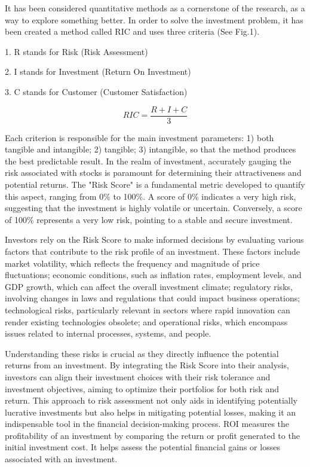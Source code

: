 \begin{multicols}{2}
It has been considered quantitative methods as a cornerstone of the
research, as a way to explore something better. In order to solve the
investment problem, it has been created a method called RIC and uses
three criteria (See Fig.1).

1. R stands for Risk (Risk Assessment)

2. I stands for Investment (Return On Investment)

3. C stands for Customer (Customer Satisfaction)

\begin{equation}
RIC = \frac{R + I + C}{3}
\end{equation}

Each criterion is responsible for the main investment parameters: 1)
both tangible and intangible; 2) tangible; 3) intangible, so that the
method produces the best predictable result. In the realm of investment,
accurately gauging the risk associated with stocks is paramount for
determining their attractiveness and potential returns. The "Risk Score"
is a fundamental metric developed to quantify this aspect, ranging from
0\% to 100\%. A score of 0\% indicates a very high risk, suggesting that
the investment is highly volatile or uncertain. Conversely, a score of
100\% represents a very low risk, pointing to a stable and secure
investment.

Investors rely on the Risk Score to make informed decisions by
evaluating various factors that contribute to the risk profile of an
investment. These factors include market volatility, which reflects the
frequency and magnitude of price fluctuations; economic conditions, such
as inflation rates, employment levels, and GDP growth, which can affect
the overall investment climate; regulatory risks, involving changes in
laws and regulations that could impact business operations;
technological risks, particularly relevant in sectors where rapid
innovation can render existing technologies obsolete; and operational
risks, which encompass issues related to internal processes, systems,
and people.

Understanding these risks is crucial as they directly influence the
potential returns from an investment. By integrating the Risk Score into
their analysis, investors can align their investment choices with their
risk tolerance and investment objectives, aiming to optimize their
portfolios for both risk and return. This approach to risk assessment
not only aids in identifying potentially lucrative investments but also
helps in mitigating potential losses, making it an indispensable tool in
the financial decision-making process. ROI measures the profitability of
an investment by comparing the return or profit generated to the initial
investment cost. It helps assess the potential financial gains or losses
associated with an investment.


\end{multicols}

